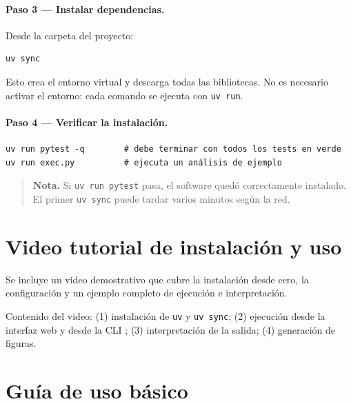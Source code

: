 \documentclass[11pt,letterpaper]{article}
\begin{document}
\paragraph{Paso 3 — Instalar dependencias.} Desde la carpeta del proyecto:
\begin{lstlisting}[style=sh]
uv sync
\end{lstlisting}
Esto crea el entorno virtual y descarga todas las bibliotecas. No es necesario
activar el entorno: cada comando se ejecuta con \texttt{uv run}.

\paragraph{Paso 4 — Verificar la instalación.}
\begin{lstlisting}[style=sh]
uv run pytest -q        # debe terminar con todos los tests en verde
uv run exec.py          # ejecuta un análisis de ejemplo
\end{lstlisting}

\begin{quote}\small
	\textbf{Nota.} Si \texttt{uv run pytest} pasa, el software quedó correctamente
	instalado. El primer \texttt{uv sync} puede tardar varios minutos según la red.
\end{quote}

\section{Video tutorial de instalación y uso}

Se incluye un video demostrativo que cubre la instalación desde cero, la
configuración y un ejemplo completo de ejecución e interpretación.

\begin{center}
\end{center}

\noindent Contenido del video: (1) instalación de \texttt{uv} y
\texttt{uv sync}; (2) ejecución desde la interfaz web y desde la CLI
; (3) interpretación de la salida; (4) generación de figuras.

\section{Guía de uso básico}
\end{document}
